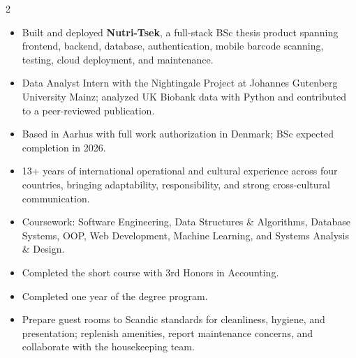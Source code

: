 \documentclass[10pt,a4paper,ragged2e,withhyper]{altacv}
\begin{document}
\begin{paracol}{2}
\begin{rightcolumn}
\divider

\begin{itemize}
    \item Built and deployed \textbf{Nutri-Tsek}, a full-stack BSc thesis product spanning frontend, backend, database, authentication, mobile barcode scanning, testing, cloud deployment, and maintenance.
    \item Data Analyst Intern with the Nightingale Project at Johannes Gutenberg University Mainz; analyzed UK Biobank data with Python and contributed to a peer-reviewed publication.
    \item Based in Aarhus with full work authorization in Denmark; BSc expected completion in 2026.
    \item 13+ years of international operational and cultural experience across four countries, bringing adaptability, responsibility, and strong cross-cultural communication.
\end{itemize}

\divider

\begin{itemize}
    \item Coursework: Software Engineering, Data Structures \& Algorithms, Database Systems, OOP, Web Development, Machine Learning, and Systems Analysis \& Design.
\end{itemize}

\begin{itemize}
    \item Completed the short course with 3rd Honors in Accounting.
\end{itemize}

\begin{itemize}
    \item Completed one year of the degree program.
\end{itemize}

\divider



\begin{itemize}
    \item Prepare guest rooms to Scandic standards for cleanliness, hygiene, and presentation; replenish amenities, report maintenance concerns, and collaborate with the housekeeping team.
\end{itemize}


\end{rightcolumn}
\end{paracol}
\end{document}
